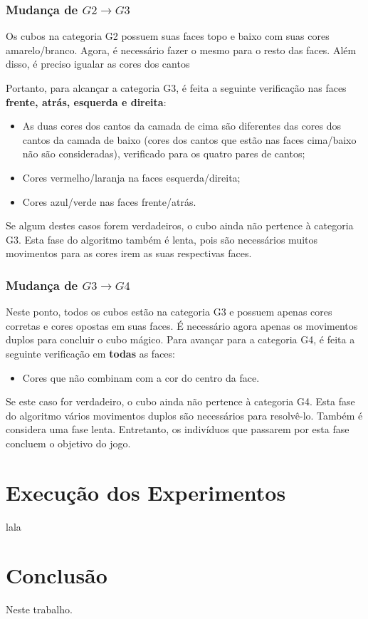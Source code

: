 \documentclass[12pt]{article}
\begin{document}
    \subsubsection{Mudança de $G2 \to G3$}
      Os cubos na categoria G2 possuem suas faces topo e baixo com suas cores amarelo/branco. Agora, é necessário fazer o mesmo para o resto das faces. Além disso, é preciso igualar as cores dos cantos 

      Portanto, para alcançar a categoria G3, é feita a seguinte verificação nas faces \textbf{frente, atrás, esquerda e direita}:

      \begin{itemize}
        \item As duas cores dos cantos da camada de cima são diferentes das cores dos cantos da camada de baixo (cores dos cantos que estão nas faces cima/baixo não são consideradas), verificado para os quatro pares de cantos;
        \item Cores vermelho/laranja na faces esquerda/direita;
        \item Cores azul/verde nas faces frente/atrás.
      \end{itemize}

      Se algum destes casos forem verdadeiros, o cubo ainda não pertence à categoria G3.
      Esta fase do algoritmo também é lenta, pois são necessários muitos movimentos para as cores irem as suas respectivas faces.

    \subsubsection{Mudança de $G3 \to G4$}
      Neste ponto, todos os cubos estão na categoria G3 e possuem apenas cores corretas e cores opostas em suas faces. É necessário agora apenas os movimentos duplos para concluir o cubo mágico. Para avançar para a categoria G4, é feita a seguinte verificação em \textbf{todas} as faces:

      \begin{itemize}
        \item Cores que não combinam com a cor do centro da face.
      \end{itemize}

      Se este caso for verdadeiro, o cubo ainda não pertence à categoria G4.
      Esta fase do algoritmo vários movimentos duplos são necessários para resolvê-lo. Também é considera uma fase lenta. Entretanto, os indivíduos que passarem por esta fase concluem o objetivo do jogo.

\section{Execução dos Experimentos}
  lala

\section{Conclusão}
  Neste trabalho.



\end{document}

